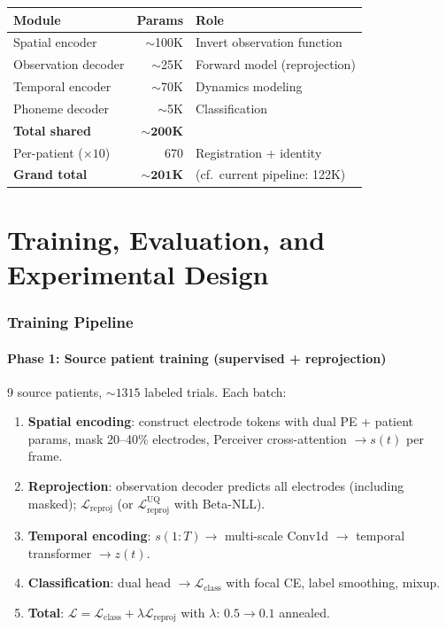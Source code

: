 \documentclass[11pt,letterpaper]{article}
\begin{document}
\begin{table}[h]\centering\small
\begin{tabular}{@{}lrl@{}}
\toprule
\textbf{Module} & \textbf{Params} & \textbf{Role} \\
\midrule
Spatial encoder & ${\sim}$100K & Invert observation function \\
Observation decoder & ${\sim}$25K & Forward model (reprojection) \\
Temporal encoder & ${\sim}$70K & Dynamics modeling \\
Phoneme decoder & ${\sim}$5K & Classification \\
\midrule
\textbf{Total shared} & $\mathbf{{\sim}200}$\textbf{K} & \\
Per-patient ($\times 10$) & 670 & Registration + identity \\
\textbf{Grand total} & $\mathbf{{\sim}201}$\textbf{K} & (cf.\ current pipeline: 122K) \\
\bottomrule
\end{tabular}
\end{table}



\part{Training, Evaluation, and Experimental Design}

\section{Training Pipeline}

\subsection{Phase 1: Source patient training (supervised + reprojection)}

9 source patients, ${\sim}1315$ labeled trials. Each batch:
\begin{enumerate}[leftmargin=2em]
\item \textbf{Spatial encoding}: construct electrode tokens with dual PE + patient params, mask 20--40\% electrodes, Perceiver cross-attention $\to s(t)$ per frame.
\item \textbf{Reprojection}: observation decoder predicts all electrodes (including masked); $\mathcal{L}_{\text{reproj}}$ (or $\mathcal{L}_{\text{reproj}}^{\text{UQ}}$ with Beta-NLL).
\item \textbf{Temporal encoding}: $s(1{:}T) \to$ multi-scale Conv1d $\to$ temporal transformer $\to z(t)$.
\item \textbf{Classification}: dual head $\to \mathcal{L}_{\text{class}}$ with focal CE, label smoothing, mixup.
\item \textbf{Total}: $\mathcal{L} = \mathcal{L}_{\text{class}} + \lambda \mathcal{L}_{\text{reproj}}$ with $\lambda$: $0.5 \to 0.1$ annealed.
\end{enumerate}
\end{document}

